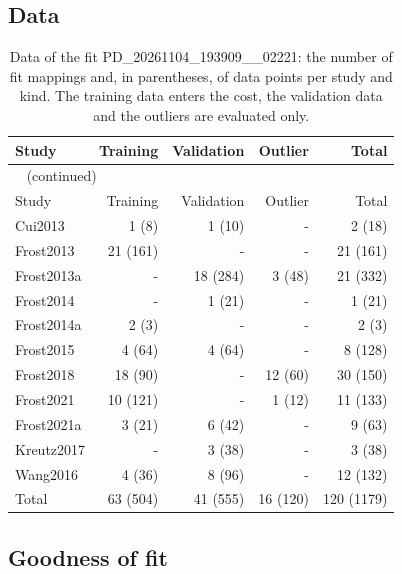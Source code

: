 \subsection{Data}

\begin{longtable}{lrrrr}
\caption{Data of the fit PD\_20261104\_193909\_\_02221: the number of fit mappings and, in parentheses, of data points per study and kind. The training data enters the cost, the validation data and the outliers are evaluated only.}\label{tab:data:PD_20261104_193909__02221} \\
\toprule
Study & Training & Validation & Outlier & Total \\
\midrule
\endfirsthead
\multicolumn{5}{l}{\small\tablename~\thetable{} (continued)} \\
\toprule
Study & Training & Validation & Outlier & Total \\
\midrule
\endhead
\bottomrule
\endlastfoot
Cui2013 & 1 (8) & 1 (10) & - & 2 (18) \\
Frost2013 & 21 (161) & - & - & 21 (161) \\
Frost2013a & - & 18 (284) & 3 (48) & 21 (332) \\
Frost2014 & - & 1 (21) & - & 1 (21) \\
Frost2014a & 2 (3) & - & - & 2 (3) \\
Frost2015 & 4 (64) & 4 (64) & - & 8 (128) \\
Frost2018 & 18 (90) & - & 12 (60) & 30 (150) \\
Frost2021 & 10 (121) & - & 1 (12) & 11 (133) \\
Frost2021a & 3 (21) & 6 (42) & - & 9 (63) \\
Kreutz2017 & - & 3 (38) & - & 3 (38) \\
Wang2016 & 4 (36) & 8 (96) & - & 12 (132) \\
Total & 63 (504) & 41 (555) & 16 (120) & 120 (1179) \\
\end{longtable}

\subsection{Goodness of fit}

